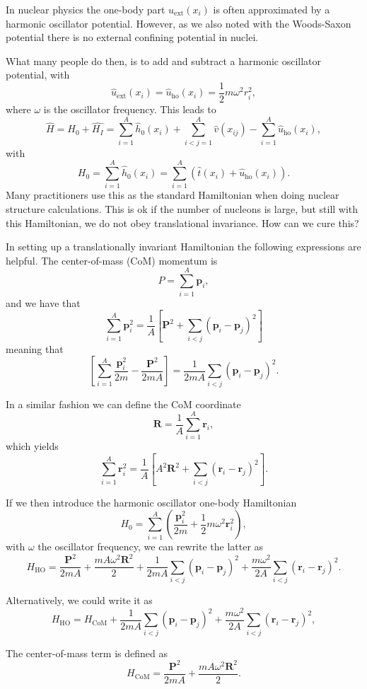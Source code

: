 \documentclass[%
oneside,                 %
final,                   %
10pt]{article}
\begin{document}
In nuclear physics the one-body part $u_{\mathrm{ext}}(x_i)$ is often 
approximated by a harmonic oscillator potential. However,  as we also noted with the Woods-Saxon potential there is no 
external confining potential in nuclei. 

What many people do then, is to add and subtract a harmonic oscillator potential,
with 
\[
\hat{u}_{\mathrm{ext}}(x_i)=\hat{u}_{\mathrm{ho}}(x_i)= \frac{1}{2}m\omega^2 r_i^2,
\]
where $\omega$ is the oscillator frequency. This leads to 
\[
    \hat{H} = \hat{H_0} + \hat{H_I} 
    = \sum_{i=1}^A \hat{h}_0(x_i) + \sum_{i < j=1}^A \hat{v}(x_{ij})-\sum_{i=1}^A\hat{u}_{\mathrm{ho}}(x_i),
\]
with 
\[
  H_0=\sum_{i=1}^A \hat{h}_0(x_i) =  \sum_{i=1}^A\left(\hat{t}(x_i) + \hat{u}_{\mathrm{ho}}(x_i)\right).
\]
Many practitioners use this as the standard Hamiltonian when doing nuclear structure calculations. 
This is ok if the number of nucleons is large, but still with this Hamiltonian, we do not obey translational invariance.  How can we cure this?


 In setting up a translationally invariant Hamiltonian  
 the following expressions are helpful.
 The center-of-mass (CoM)  momentum is
\[
    P=\sum_{i=1}^A\bm{p}_i,
 \]
 and we have that
\[
 \sum_{i=1}^A\bm{p}_i^2 =
 \frac{1}{A}\left[\bm{P}^2+\sum_{i < j}(\bm{p}_i-\bm{p}_j)^2\right]
 \]
 meaning that
\[
 \left[\sum_{i=1}^A\frac{\bm{p}_i^2}{2m} -\frac{\bm{P}^2}{2mA}\right]
 =\frac{1}{2mA}\sum_{i < j}(\bm{p}_i-\bm{p}_j)^2.
 \]

 In a similar fashion we can define the CoM coordinate
\[
     \bm{R}=\frac{1}{A}\sum_{i=1}^{A}\bm{r}_i,
 \]
 which yields
 \[
 \sum_{i=1}^A\bm{r}_i^2 =
 \frac{1}{A}\left[A^2\bm{R}^2+\sum_{i < j}(\bm{r}_i-\bm{r}_j)^2\right].
 \]


 If we then introduce the harmonic oscillator one-body Hamiltonian
\[
      H_0= \sum_{i=1}^A\left(\frac{\bm{p}_i^2}{2m}+
	   \frac{1}{2}m\omega^2\bm{r}_i^2\right),
 \]
 with $\omega$ the oscillator frequency,
 we can rewrite the latter as 
 \[
      H_{\mathrm{HO}}= \frac{\bm{P}^2}{2mA}+\frac{mA\omega^2\bm{R}^2}{2}
	    +\frac{1}{2mA}\sum_{i < j}(\bm{p}_i-\bm{p}_j)^2
	    +\frac{m\omega^2}{2A}\sum_{i < j}(\bm{r}_i-\bm{r}_j)^2.
     \label{eq:obho}
 \]

Alternatively, we could write it as	
\[
 H_{\mathrm{HO}}= H_{\mathrm{CoM}}+\frac{1}{2mA}\sum_{i < j}(\bm{p}_i-\bm{p}_j)^2
	    +\frac{m\omega^2}{2A}\sum_{i < j}(\bm{r}_i-\bm{r}_j)^2,
 \]

The center-of-mass term is defined as
 \[
      H_{\mathrm{CoM}}= \frac{\bm{P}^2}{2mA}+\frac{mA\omega^2\bm{R}^2}{2}.
 \]
\end{document}
